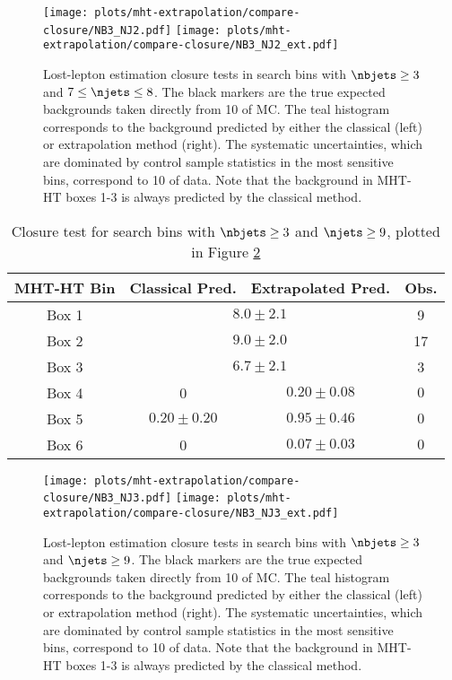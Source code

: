 \begin{figure}
  \begin{center}
    \texttt{[image: plots/mht-extrapolation/compare-closure/NB3\_NJ2.pdf]} 
    \texttt{[image: plots/mht-extrapolation/compare-closure/NB3\_NJ2\_ext.pdf]}
  \caption{
      Lost-lepton estimation closure tests in search bins with $\nbjets\geq3$ and $7\leq\njets\leq8$.  The black markers are the true expected backgrounds taken directly from 10 \fbinv of \ttbar MC.  The teal histogram corresponds to the background predicted by either the classical (left) or extrapolation method (right).  The systematic uncertainties, which are dominated by control sample statistics in the most sensitive bins, correspond to 10 \invfb of data.  Note that the background in MHT-HT boxes 1-3 is always predicted by the classical method.
    }
    \label{fig:ll-closure-nb3-nj2}
  \end{center}
\end{figure}
\clearpage

\begin{table}[h]\centering
  \caption{Closure test for search bins with $\nbjets\geq3$ and $\njets\geq9$, plotted in Figure \ref{fig:ll-closure-nb3-nj3}}
  \begin{tabular}{|c|c|c|c|}
    \hline
    MHT-HT Bin & Classical Pred. & Extrapolated Pred. & Obs. \\ \hline
Box 1 & \multicolumn{2}{c|}{$8.0\pm2.1$} &   9 \\
Box 2 & \multicolumn{2}{c|}{$9.0\pm2.0$} &  17 \\
Box 3 & \multicolumn{2}{c|}{$6.7\pm2.1$} &   3 \\
\hline
Box 4 & 0 & $0.20\pm0.08$ & $  0$ \\
Box 5 & $0.20\pm0.20$ & $0.95\pm0.46$ & $  0$ \\
Box 6 & 0 & $0.07\pm0.03$ & $  0$ \\
    \hline  \end{tabular}
    \label{tab:ll-closure-nb3-nj3}
\end{table}

\begin{figure}
  \begin{center}
    \texttt{[image: plots/mht-extrapolation/compare-closure/NB3\_NJ3.pdf]} 
    \texttt{[image: plots/mht-extrapolation/compare-closure/NB3\_NJ3\_ext.pdf]}
  \caption{
      Lost-lepton estimation closure tests in search bins with $\nbjets\geq3$ and $\njets\geq9$.  The black markers are the true expected backgrounds taken directly from 10 \fbinv of \ttbar MC.  The teal histogram corresponds to the background predicted by either the classical (left) or extrapolation method (right).  The systematic uncertainties, which are dominated by control sample statistics in the most sensitive bins, correspond to 10 \invfb of data. Note that the background in MHT-HT boxes 1-3 is always predicted by the classical method.
    }
    \label{fig:ll-closure-nb3-nj3}
  \end{center}
\end{figure}
\clearpage

